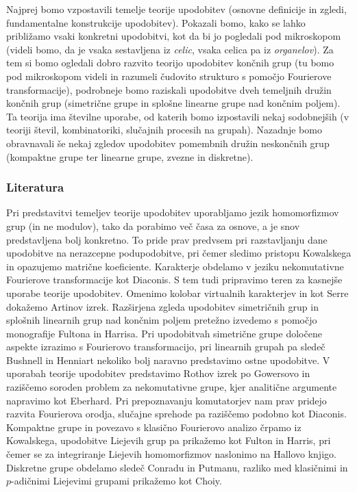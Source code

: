 \documentclass[11pt]{book}
\theoremstyle{definition}
\theoremstyle{zgled}
\theoremstyle{zgledbrezstevilke}
\theoremstyle{odprtproblem}
\theoremstyle{domacanaloga}
\theoremstyle{izrek}
\begin{document}
Najprej bomo vzpostavili temelje teorije upodobitev (osnovne definicije in zgledi, fundamentalne konstrukcije upodobitev). Pokazali bomo, kako se lahko približamo vsaki konkretni upodobitvi, kot da bi jo pogledali pod mikroskopom (videli bomo, da je vsaka sestavljena iz \emph{celic}, vsaka celica pa iz \emph{organelov}). Za tem si bomo ogledali dobro razvito teorijo upodobitev končnih grup (tu bomo pod mikroskopom videli in razumeli čudovito strukturo s pomočjo Fourierove transformacije), podrobneje bomo raziskali upodobitve dveh temeljnih družin končnih grup (simetrične grupe in splošne linearne grupe nad končnim poljem). Ta teorija ima številne uporabe, od katerih bomo izpostavili nekaj sodobnejših (v teoriji števil, kombinatoriki, slučajnih procesih na grupah). Nazadnje bomo obravnavali še nekaj zgledov upodobitev pomembnih družin neskončnih grup (kompaktne grupe ter linearne grupe, zvezne in diskretne).

\newpage

\subsubsection{Literatura}

Pri predstavitvi temeljev teorije upodobitev uporabljamo jezik homomorfizmov grup (in ne modulov), tako da porabimo več časa za osnove, a je snov predstavljena bolj konkretno. To pride prav predvsem pri razstavljanju dane upodobitve na nerazcepne podupodobitve, pri čemer sledimo pristopu Kowalskega in opazujemo matrične koeficiente. Karakterje obdelamo v jeziku nekomutativne Fourierove transformacije kot Diaconis. S tem tudi pripravimo teren za kasnejše uporabe teorije upodobitev. Omenimo kolobar virtualnih karakterjev in kot Serre dokažemo Artinov izrek. Razširjena zgleda upodobitev simetričnih grup in splošnih linearnih grup nad končnim poljem pretežno izvedemo s pomočjo monografije Fultona in Harrisa. Pri upodobitvah simetrične grupe določene aspekte izrazimo s Fourierovo transformacijo, pri linearnih grupah pa sledeč Bushnell in Henniart nekoliko bolj naravno predstavimo ostne upodobitve. V uporabah teorije upodobitev predstavimo Rothov izrek po Gowersovo in raziščemo soroden problem za nekomutativne grupe, kjer analitične argumente napravimo kot Eberhard. Pri prepoznavanju komutatorjev nam prav pridejo razvita Fourierova orodja, slučajne sprehode pa raziščemo podobno kot Diaconis. Kompaktne grupe in povezavo s klasično Fourierovo analizo črpamo iz Kowalskega, upodobitve Liejevih grup pa prikažemo kot Fulton in Harris, pri čemer se za integriranje Liejevih homomorfizmov naslonimo na Hallovo knjigo. Diskretne grupe obdelamo sledeč Conradu in Putmanu, razliko med klasičnimi in $p$-adičnimi Liejevimi grupami prikažemo kot Choiy.
\end{document}
